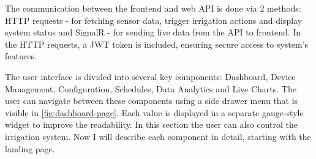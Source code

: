 The communication between the frontend and web API is done via 2 methods: HTTP requests - for fetching sensor data, trigger
irrigation actions and display system status and SignalR - for sending live data from the API to frontend. In the HTTP requests,
a JWT token is included, ensuring secure access to system's features.

The user interface is divided into several key components: Dashboard, Device Management, Configuration, Schedules, Data Analytics and Live Charts.
The user can navigate between these components using a side drawer menu that is visible in \ref{fig:dashboard-page}. 
Each value is displayed in a separate gauge-style widget to improve the readability. In this section the user can also control the irrigation system.
Now I will describe each component in detail, starting with the landing page.

